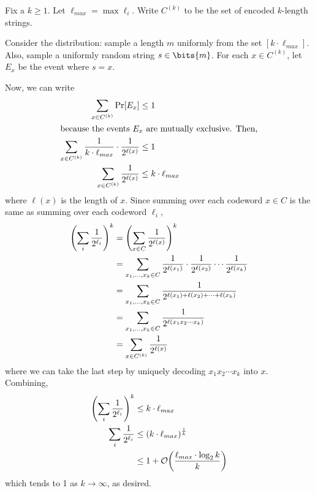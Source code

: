 \documentclass[class=co432,notes,tikz]{agony}
\begin{document}
\begin{prf}
  Fix a $k \geq 1$. Let $\ell_{max} = \max \ell_i$.
  Write $C^{(k)}$ to be the set of encoded $k$-length strings.

  Consider the distribution:
  sample a length $m$ uniformly from the set $[k\cdot \ell_{max}]$.
  Also, sample a uniformly random string $s \in \bits{m}$.
  For each $x \in C^{(k)}$, let $E_x$ be the event where $s = x$.

  Now, we can write
  \begin{align*}
    \sum_{x \in C^{(k)}} \Pr[E_x]                                               & \leq 1                \\
    \intertext{because the events $E_x$ are mutually exclusive. Then,}
    \sum_{x \in C^{(k)}} \frac{1}{k\cdot\ell_{max}} \cdot \frac{1}{2^{\ell(x)}} & \leq 1                \\
    \sum_{x \in C^{(k)}} \frac{1}{2^{\ell(x)}}                                  & \leq k\cdot\ell_{max}
  \end{align*}
  where $\ell(x)$ is the length of $x$. Since summing over each codeword $x \in C$
  is the same as summing over each codeword $\ell_i$,
  \begin{align*}
    \qty(\sum_i \frac{1}{2^{\ell_i}})^k
     & = \qty(\sum_{x \in C}\frac{1}{2^{\ell(x)}})^k                                                                      \\
     & = \sum_{x_1,\dotsc,x_k \in C} \frac{1}{2^{\ell(x_1)}} \cdot \frac{1}{2^{\ell(x_2)}} \cdots \frac{1}{2^{\ell(x_k)}} \\
     & = \sum_{x_1,\dotsc,x_k \in C} \frac{1}{2^{\ell(x_1) + \ell(x_2) + \dotsb + \ell(x_k)}}                             \\
     & = \sum_{x_1,\dotsc,x_k \in C} \frac{1}{2^{\ell(x_1x_2 \cdots x_k)}}                                                \\
     & = \sum_{x \in C^{(k)}} \frac{1}{2^{\ell(x)}}
  \end{align*}
  where we can take the last step by uniquely decoding $x_1x_2\cdots x_k$ into $x$.
  Combining,
  \begin{align*}
    \qty(\sum_i \frac{1}{2^{\ell_i}})^k & \leq k \cdot \ell_{max}                            \\
    \sum_i \frac{1}{2^{\ell_i}}         & \leq (k \cdot \ell_{max})^{\frac{1}{k}}            \\
                                        & \leq 1 + \order{\frac{\ell_{max}\cdot\log_2 k}{k}}
  \end{align*}
  which tends to 1 as $k \to \infty$, as desired.
\end{prf}
\end{document}
